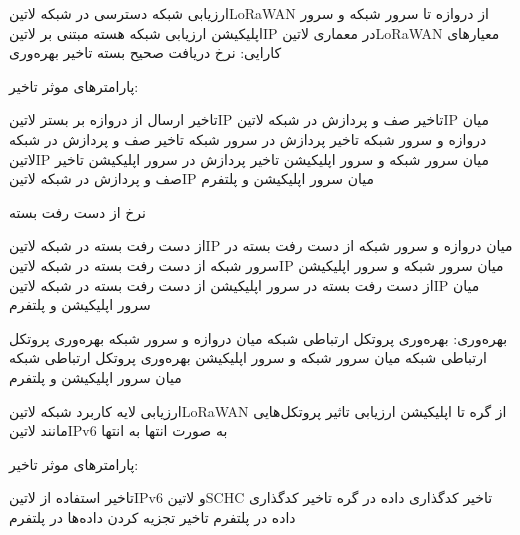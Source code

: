 \documentclass[dvipsnames]{beamer}
\begin{document}
\begin{persian}

	\begin{frame}{ارزیابی شبکه دسترسی در شبکه ‌لاتین{LoRaWAN} از دروازه تا سرور شبکه و سرور اپلیکیشن}
		 ارزیابی شبکه هسته مبتنی بر ‌لاتین{IP} در معماری ‌لاتین{LoRaWAN}
		 معیارهای کارایی:
		 نرخ دریافت صحیح بسته
		 تاخیر
		 بهره‌وری
	\end{frame}

	\begin{frame}{پارامترهای موثر}
	   تاخیر:

	   تاخیر ارسال از دروازه بر بستر ‌لاتین{IP}
	   تاخیر صف و پردازش در شبکه ‌لاتین{IP} میان دروازه و سرور شبکه
	   تاخیر پردازش در سرور شبکه
	   تاخیر صف و پردازش در شبکه ‌لاتین{IP} میان سرور شبکه و سرور اپلیکیشن
	   تاخیر پردازش در سرور اپلیکیشن
	   تاخیر صف و پردازش در شبکه ‌لاتین{IP} میان سرور اپلیکیشن و پلتفرم


	نرخ از دست رفت بسته

	 از دست رفت بسته در شبکه ‌لاتین{IP} میان دروازه و سرور شبکه
	 از دست رفت بسته در سرور شبکه
	 از دست رفت بسته در شبکه ‌لاتین{IP} میان سرور شبکه و سرور اپلیکیشن
	 از دست رفت بسته در سرور اپلیکیشن
	 از دست رفت بسته در شبکه ‌لاتین{IP} میان سرور اپلیکیشن و پلتفرم


	 بهره‌وری:
	 بهره‌وری پروتکل ارتباطی شبکه میان دروازه و سرور شبکه
	 بهره‌وری پروتکل ارتباطی شبکه میان سرور شبکه و سرور اپلیکیشن
	 بهره‌وری پروتکل ارتباطی شبکه میان سرور اپلیکیشن و پلتفرم

	\end{frame}

	\begin{frame}{ارزیابی لایه کاربرد شبکه ‌لاتین{LoRaWAN} از گره تا اپلیکیشن}
	   ارزیابی تاثیر پروتکل‌هایی مانند ‌لاتین{IPv6} به صورت انتها به انتها
	\end{frame}

	\begin{frame}{پارامترهای موثر}
	   تاخیر:

	   تاخیر استفاده از ‌لاتین{IPv6} و ‌لاتین{SCHC}
	   تاخیر کدگذاری داده در گره
	   تاخیر کدگذاری داده در پلتفرم
	   تاخیر تجزیه کردن داده‌ها در پلتفرم


\end{frame}
\end{persian}
\end{document}
